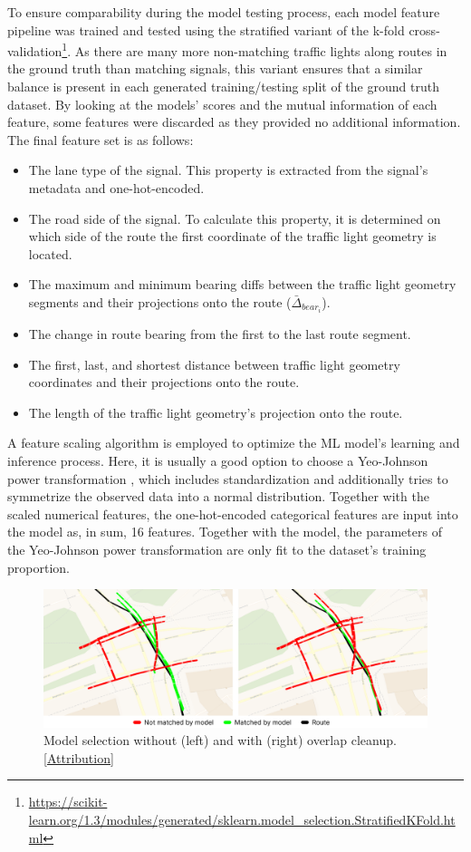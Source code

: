 To ensure comparability during the model testing process, each model feature pipeline was trained and tested using the stratified variant of the k-fold cross-validation\footnote{\url{https://scikit-learn.org/1.3/modules/generated/sklearn.model_selection.StratifiedKFold.html}}. As there are many more non-matching traffic lights along routes in the ground truth than matching signals, this variant ensures that a similar balance is present in each generated training/testing split of the ground truth dataset. By looking at the models' scores and the mutual information of each feature, some features were discarded as they provided no additional information. The final feature set is as follows:

\begin{itemize}
    \item The lane type of the signal. This property is extracted from the signal's metadata and one-hot-encoded.
    \item The road side of the signal. To calculate this property, it is determined on which side of the route the first coordinate of the traffic light geometry is located.
    \item The maximum and minimum bearing diffs between the traffic light geometry segments and their projections onto the route ($\bar{\Delta}_{bear_i}$).
    \item The change in route bearing from the first to the last route segment. 
    \item The first, last, and shortest distance between traffic light geometry coordinates and their projections onto the route.
    \item The length of the traffic light geometry's projection onto the route.
\end{itemize}

A feature scaling algorithm is employed to optimize the ML model's learning and inference process. Here, it is usually a good option to choose a Yeo-Johnson power transformation \cite{yeo_new_2000}, which includes standardization and additionally tries to symmetrize the observed data into a normal distribution. Together with the scaled numerical features, the one-hot-encoded categorical features are input into the model as, in sum, 16 features. Together with the model, the parameters of the Yeo-Johnson power transformation are only fit to the dataset's training proportion.

\begin{figure}[htbp]
\centering
\includegraphics[width=\linewidth]{images/sg-selection-overlap-cleanup.png}
\caption{Model selection without (left) and with (right) overlap cleanup. [\hyperref[attribution]{Attribution}]}
\label{fig:sg-selection-overlap-cleanup}
\end{figure}

